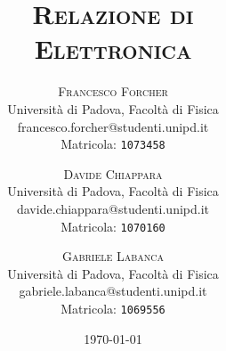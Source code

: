 \title{
\vspace{-2cm}
\fontsize{48pt}{10pt}\selectfont
\textsc{Relazione di \\[3mm] Elettronica}
}
\author{
\large
\textsc{Francesco Forcher}\\[2mm]
\normalsize Università di Padova, Facoltà di Fisica\\
\normalsize francesco.forcher@studenti.unipd.it\\
\normalsize Matricola: \texttt{1073458}\\
\and
\large
\textsc{Davide Chiappara}\\[2mm]
\normalsize Università di Padova, Facoltà di Fisica\\
\normalsize davide.chiappara@studenti.unipd.it\\
\normalsize Matricola: \texttt{1070160}\\
\and
\large
\textsc{Gabriele Labanca}\\[2mm]
\normalsize Università di Padova, Facoltà di Fisica\\
\normalsize gabriele.labanca@studenti.unipd.it\\
\normalsize Matricola: \texttt{1069556}
}
\date{\today}
